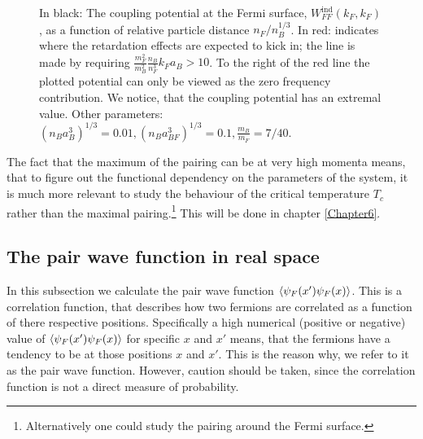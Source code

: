 \begin{figure} 
\begin{center}  
  
\caption{In black: The coupling potential at the Fermi surface, $W_{FF}^\text{ind}(k_F,k_F)$, as a function of relative particle distance $n_F/n_B^{1/3}$. In red: indicates where the retardation effects are expected to kick in; the line is made by requiring $\frac{m_F^2}{m_B^2}\frac{n_B}{n_F^3} k_Fa_B > 10$.  To the right of the red line the plotted potential can only be viewed as the zero frequency contribution. We notice, that the coupling potential has an extremal value. Other parameters: $(n_Ba_B^3)^{1/3} = 0.01, (n_Ba_{BF}^3)^{1/3} = 0.1, \frac{m_B}{m_F} = 7/40.$}  
\label{fig.maxkDeltakaBdepend}  
\end{center}    
\end{figure}

The fact that the maximum of the pairing can be at very high momenta means, that to figure out the functional dependency on the parameters of the system, it is much more relevant to study the behaviour of the critical temperature $T_c$ rather than the maximal pairing.\footnote{Alternatively one could study the pairing around the Fermi surface.} This will be done in chapter \ref{Chapter6}.

\subsection{The pair wave function in real space}
In this subsection we calculate the pair wave function $\braket{\psi_F(x')\psi_F(x)}$. This is a correlation function, that describes how two fermions are correlated as a function of there respective positions. Specifically a high numerical (positive or negative) value of $\braket{\psi_F(x')\psi_F(x)}$ for specific $x$ and $x'$ means, that the fermions have a tendency to be at those positions $x$ and $x'$. This is the reason why, we refer to it as the pair wave function. However, caution should be taken, since the correlation function is not a direct measure of probability. 

